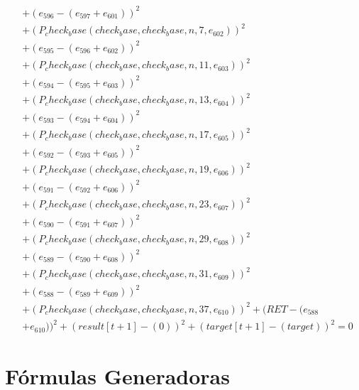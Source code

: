 \documentclass[10pt, a4paper]{article}
\begin{document}
\begin{align*}
& + (e_{596} - (e_{597} + e_{601}))^{2} \\
& + (P_check_base(check_base, check_base, n, 7, e_{602}))^{2} \\
& + (e_{595} - (e_{596} + e_{602}))^{2} \\
& + (P_check_base(check_base, check_base, n, 11, e_{603}))^{2} \\
& + (e_{594} - (e_{595} + e_{603}))^{2} \\
& + (P_check_base(check_base, check_base, n, 13, e_{604}))^{2} \\
& + (e_{593} - (e_{594} + e_{604}))^{2} \\
& + (P_check_base(check_base, check_base, n, 17, e_{605}))^{2} \\
& + (e_{592} - (e_{593} + e_{605}))^{2} \\
& + (P_check_base(check_base, check_base, n, 19, e_{606}))^{2} \\
& + (e_{591} - (e_{592} + e_{606}))^{2} \\
& + (P_check_base(check_base, check_base, n, 23, e_{607}))^{2} \\
& + (e_{590} - (e_{591} + e_{607}))^{2} \\
& + (P_check_base(check_base, check_base, n, 29, e_{608}))^{2} \\
& + (e_{589} - (e_{590} + e_{608}))^{2} \\
& + (P_check_base(check_base, check_base, n, 31, e_{609}))^{2} \\
& + (e_{588} - (e_{589} + e_{609}))^{2} \\
& + (P_check_base(check_base, check_base, n, 37, e_{610}))^{2} + (RET - (e_{588} \\
& + e_{610}))^{2} + (result[t+1] - (0))^{2} + (target[t+1] - (target))^{2} = 0
\end{align*}\part{Fórmulas Generadoras}
\end{document}
